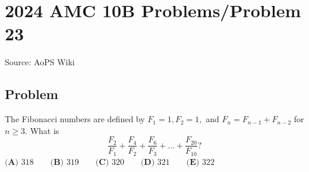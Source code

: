 \documentclass[12pt]{article}
\begin{document}
\section*{{2024 AMC 10B Problems/Problem 23}}
Source: AoPS Wiki

\subsection*{Problem}
The Fibonacci numbers are defined by $F_1 = 1, F_2 = 1,$ and $F_n = F_{n-1} + F_{n-2}$ for $n \geq 3.$ What is \[{\frac{F_2}{F_1}} + {\frac{F_4}{F_2}} + {\frac{F_6}{F_3}} + ... + {\frac{F_{20}}{F_{10}}}?\] $\textbf{(A) } 318 \qquad\textbf{(B) } 319 \qquad\textbf{(C) } 320 \qquad\textbf{(D) } 321 \qquad\textbf{(E) } 322$
\end{document}
